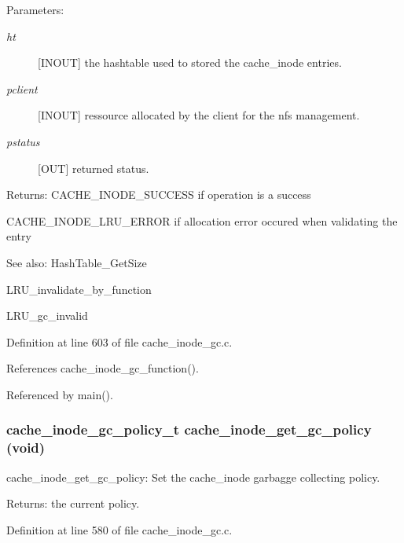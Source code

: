 \begin{Desc}
\item[Parameters:]
\begin{description}
\item[{\em ht}][INOUT] the hashtable used to stored the cache\_\-inode entries. \item[{\em pclient}][INOUT] ressource allocated by the client for the nfs management. \item[{\em pstatus}][OUT] returned status.\end{description}
\end{Desc}
\begin{Desc}
\item[Returns:]CACHE\_\-INODE\_\-SUCCESS if operation is a success \par
 

CACHE\_\-INODE\_\-LRU\_\-ERROR if allocation error occured when validating the entry\end{Desc}
\begin{Desc}
\item[See also:]Hash\-Table\_\-Get\-Size 

LRU\_\-invalidate\_\-by\_\-function 

LRU\_\-gc\_\-invalid \end{Desc}


Definition at line 603 of file cache\_\-inode\_\-gc.c.

References cache\_\-inode\_\-gc\_\-function().

Referenced by main().
\subsubsection{\setlength{\rightskip}{0pt plus 5cm}cache\_\-inode\_\-gc\_\-policy\_\-t cache\_\-inode\_\-get\_\-gc\_\-policy (void)}\label{group__Cache__inode__gc__interface_ga1}


cache\_\-inode\_\-get\_\-gc\_\-policy: Set the cache\_\-inode garbagge collecting policy.

\begin{Desc}
\item[Returns:]the current policy. \end{Desc}


Definition at line 580 of file cache\_\-inode\_\-gc.c.
